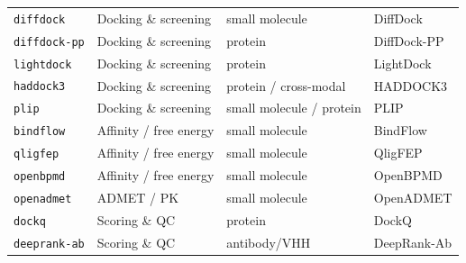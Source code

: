 \documentclass[11pt]{article}
\begin{document}
\begin{footnotesize}
\begin{longtable}{@{}>{\raggedright\arraybackslash}p{25mm}>{\raggedright\arraybackslash}p{26mm}>{\raggedright\arraybackslash}p{28mm}>{\raggedright\arraybackslash}p{70mm}@{}}
\texttt{diffdock} & Docking \& screening & small molecule & DiffDock \citep{corso_diffdock_2023} \\
\texttt{diffdock-pp} & Docking \& screening & protein & DiffDock-PP \citep{ketata_diffdock-pp_2023} \\
\texttt{lightdock} & Docking \& screening & protein & LightDock \citep{jimenez-garcia_lightdock_2018} \\
\texttt{haddock3} & Docking \& screening & protein / cross-modal & HADDOCK3 \citep{giulini_haddock3_2025} \\
\texttt{plip} & Docking \& screening & small molecule / protein & PLIP \citep{schake_plip_2025} \\
\texttt{bindflow} & Affinity / free energy & small molecule & BindFlow \citep{leon_bindflow_2026} \\
\texttt{qligfep} & Affinity / free energy & small molecule & QligFEP \citep{alencar_araripe_doing_2025} \\
\texttt{openbpmd} & Affinity / free energy & small molecule & OpenBPMD \citep{lukauskis_open_2022} \\
\texttt{openadmet} & ADMET / PK & small molecule & OpenADMET \citep{fraser_mapping_2026} \\
\texttt{dockq} & Scoring \& QC & protein & DockQ \citep{basu_dockq_2016,mirabello_dockq_2024} \\
\texttt{deeprank-ab} & Scoring \& QC & antibody/VHH & DeepRank-Ab \citep{xu_deeprank-ab_2025} \\
\bottomrule
\end{longtable}
\end{footnotesize}



\end{document}
